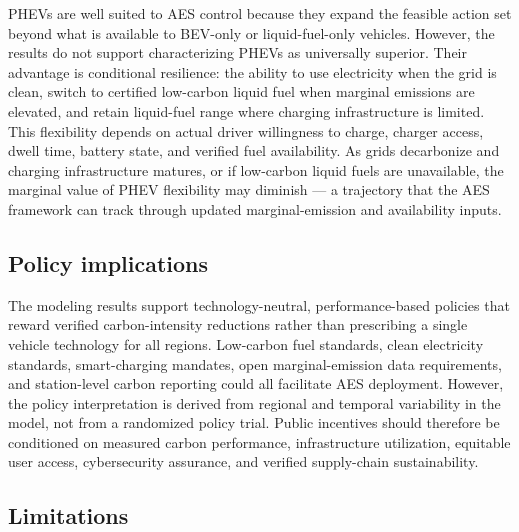 \documentclass[cleantechnol,article,submit,pdftex,moreauthors]{Definitions/mdpi}
\begin{document}
PHEVs are well suited to AES control because they expand the feasible action set beyond what is available to BEV-only or liquid-fuel-only vehicles. However, the results do not support characterizing PHEVs as universally superior. Their advantage is conditional resilience: the ability to use electricity when the grid is clean, switch to certified low-carbon liquid fuel when marginal emissions are elevated, and retain liquid-fuel range where charging infrastructure is limited. This flexibility depends on actual driver willingness to charge, charger access, dwell time, battery state, and verified fuel availability. As grids decarbonize and charging infrastructure matures, or if low-carbon liquid fuels are unavailable, the marginal value of PHEV flexibility may diminish --- a trajectory that the AES framework can track through updated marginal-emission and availability inputs.


\subsection{Policy implications}
\label{subsec:discuss_policy}

The modeling results support technology-neutral, performance-based policies that reward verified carbon-intensity reductions rather than prescribing a single vehicle technology for all regions. Low-carbon fuel standards, clean electricity standards, smart-charging mandates, open marginal-emission data requirements, and station-level carbon reporting could all facilitate AES deployment. However, the policy interpretation is derived from regional and temporal variability in the model, not from a randomized policy trial. Public incentives should therefore be conditioned on measured carbon performance, infrastructure utilization, equitable user access, cybersecurity assurance, and verified supply-chain sustainability.


\subsection{Limitations}
\label{subsec:limitations}
\end{document}
